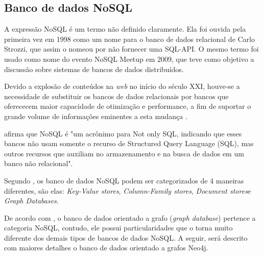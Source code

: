 \subsection{Banco de dados NoSQL}

\par A expressão NoSQL é um termo não definido claramente. Ela foi ouvida pela primeira vez em 1998 como um nome para o banco de dados relacional de Carlo Strozzi, que assim o nomeou por não fornecer uma SQL-API. O mesmo termo foi usado como nome do evento NoSQL Meetup em 2009, que teve como objetivo a discussão sobre sistemas de bancos de dados distribuídos.

\par Devido a explosão de conteúdos na \textit{web} no início do século XXI, houve-se a necessidade de substituir os bancos de dados relacionais por bancos que oferececem maior capacidade de otimização e performance, a fim de suportar o grande volume de informações eminentes a esta mudança \cite{bruggen_learning_neo4j}.

\par {} afirma que NoSQL é "um acrônimo para Not only SQL, indicando que esses bancos não usam somente o recurso de Structured Query Language (SQL), mas outros recursos que auxiliam no armazenamento e na busca de dados em um banco  não relacional".

\par Segundo , os banco de dados NoSQL podem ser categorizados de 4 maneiras diferentes, são elas: \textit{Key-Value stores}\footnotemark[6], \textit{Column-Family stores}\footnotemark[7], \textit{Document stores}\footnotemark[8] e \textit{Graph Databases}\footnotemark[9].





\par De acordo com , o banco de dados orientado a grafo (\textit{graph database}) pertence a categoria NoSQL, contudo, ele possui particularidades que o torna muito diferente dos demais tipos de bancos de dados NoSQL. A seguir, será descrito com maiores detalhes o banco de dados orientado a grafos Neo4j.
